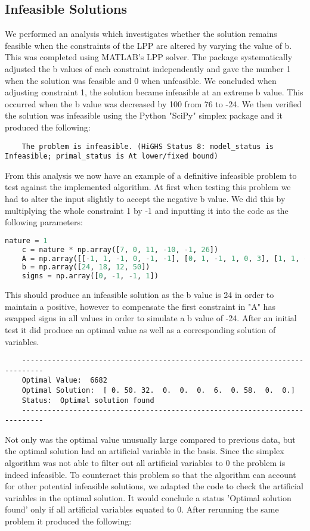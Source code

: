 \documentclass{article}
\numberwithin{equation}{section}
\begin{document}
\subsection{Infeasible Solutions}
We performed an analysis which investigates whether the solution remains feasible when the constraints of the LPP are altered by varying the value of b.  This was completed using MATLAB's LPP solver. The package systematically adjusted the b values of each constraint independently and gave the number 1 when the solution was feasible and 0 when unfeasible. We concluded when adjusting constraint 1, the solution became infeasible at an extreme b value. This occurred when the b value was decreased by 100 from 76 to -24. We then verified the solution was infeasible using the Python "SciPy" simplex package and it produced the following:
\begin{lstlisting}
    The problem is infeasible. (HiGHS Status 8: model_status is Infeasible; primal_status is At lower/fixed bound)
\end{lstlisting}
From this analysis we now have an example of a definitive infeasible problem to test against the implemented algorithm. At first when testing this problem we had to alter the input slightly to accept the negative b value. We did this by multiplying the whole constraint 1 by -1 and inputting it into the code as the following parameters:
\begin{lstlisting}[language=Python, basicstyle=\scriptsize, frame=single]
    nature = 1                                             
    c = nature * np.array([7, 0, 11, -10, -1, 26])
    A = np.array([[-1, 1, -1, 0, -1, -1], [0, 1, -1, 1, 0, 3], [1, 1, -3, 1, 1, 0], [1, 1, 0, 0, 0, 1]])
    b = np.array([24, 18, 12, 50])
    signs = np.array([0, -1, -1, 1])
\end{lstlisting}
This should produce an infeasible solution as the b value is 24 in order to maintain a positive, however to compensate the first constraint in "A" has swapped signs in all values in order to simulate a b value of -24. After an initial test it did produce an optimal value as well as a corresponding solution of variables. 
\begin{lstlisting}
    ---------------------------------------------------------------------------
    Optimal Value:  6682
    Optimal Solution:  [ 0. 50. 32.  0.  0.  0.  6.  0. 58.  0.  0.]
    Status:  Optimal solution found
    ---------------------------------------------------------------------------
\end{lstlisting}
Not only was the optimal value unusually large compared to previous data, but the optimal solution had an artificial variable in the basis. Since the simplex algorithm was not able to filter out all artificial variables to 0 the problem is indeed infeasible. To counteract this problem so that the algorithm can account for other potential infeasible solutions, we adapted the code to check the artificial variables in the optimal solution. It would conclude a status  'Optimal solution found' only if all artificial variables equated to 0. After rerunning the same problem it produced the following:
\end{document}
